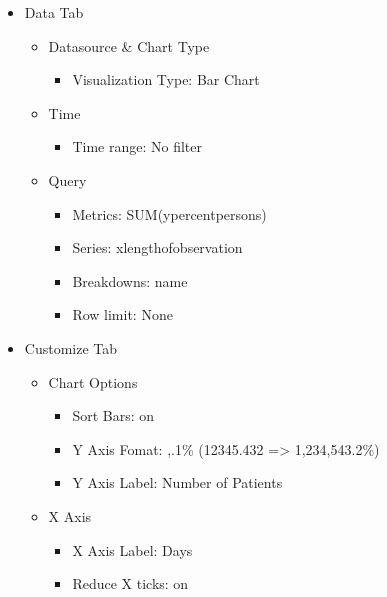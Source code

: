 \documentclass[
]{book}
\providecommand{\tightlist}{%
  \setlength{\itemsep}{0pt}\setlength{\parskip}{0pt}}
\begin{document}
\begin{itemize}
\tightlist
\item
  Data Tab

  \begin{itemize}
  \tightlist
  \item
    Datasource \& Chart Type

    \begin{itemize}
    \tightlist
    \item
      Visualization Type: Bar Chart
    \end{itemize}
  \item
    Time

    \begin{itemize}
    \tightlist
    \item
      Time range: No filter
    \end{itemize}
  \item
    Query

    \begin{itemize}
    \tightlist
    \item
      Metrics: SUM(ypercentpersons)
    \item
      Series: xlengthofobservation
    \item
      Breakdowns: name
    \item
      Row limit: None
    \end{itemize}
  \end{itemize}
\item
  Customize Tab

  \begin{itemize}
  \tightlist
  \item
    Chart Options

    \begin{itemize}
    \tightlist
    \item
      Sort Bars: on
    \item
      Y Axis Fomat: ,.1\% (12345.432 =\textgreater{} 1,234,543.2\%)
    \item
      Y Axis Label: Number of Patients
    \end{itemize}
  \item
    X Axis

    \begin{itemize}
    \tightlist
    \item
      X Axis Label: Days
    \item
      Reduce X ticks: on
    \end{itemize}
  \end{itemize}
\end{itemize}
\end{document}
